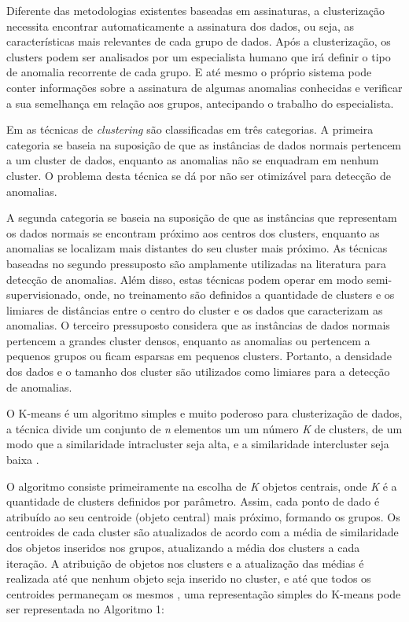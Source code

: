 \indent Diferente das metodologias existentes baseadas em assinaturas, a clusterização necessita encontrar automaticamente a assinatura dos dados, ou seja, as características mais relevantes de cada grupo de dados. Após a clusterização, os clusters podem ser analisados por um especialista humano que irá definir o tipo de anomalia recorrente de cada grupo. E até mesmo o próprio sistema pode conter informações sobre a assinatura de algumas anomalias conhecidas e verificar a sua semelhança em relação aos grupos, antecipando o trabalho do especialista.

\indent Em   as técnicas de \textit{clustering} são classificadas em três categorias. A primeira categoria se baseia na suposição de que as instâncias de dados normais pertencem a um cluster de dados, enquanto as anomalias não se enquadram em nenhum cluster. O problema desta técnica se dá por não ser otimizável para detecção de anomalias.

\indent A segunda categoria se baseia na suposição de que as instâncias que representam os dados normais se encontram próximo aos centros dos clusters, enquanto as anomalias se localizam mais distantes do seu cluster mais próximo. As técnicas baseadas no segundo pressuposto são amplamente utilizadas na literatura para detecção de anomalias. Além disso, estas técnicas podem operar em modo semi-supervisionado, onde, no treinamento são definidos a quantidade de clusters e os limiares de distâncias entre o centro do cluster e os dados que caracterizam as anomalias. O terceiro pressuposto considera que as instâncias de dados normais pertencem a grandes cluster  densos, enquanto as anomalias ou pertencem a pequenos grupos ou ficam esparsas em pequenos clusters. Portanto, a densidade dos dados e o tamanho dos cluster são utilizados como limiares para a detecção de anomalias.

\indent O K-means é um algoritmo simples e muito poderoso para clusterização de dados, a técnica divide um conjunto de \textit{n} elementos um um número \textit{K} de clusters, de um modo que a similaridade intracluster seja alta, e a similaridade intercluster seja baixa \cite{goldschmidt2005}.

\indent O algoritmo consiste primeiramente na escolha de \textit{K} objetos centrais, onde \textit{K} é a quantidade de clusters definidos por parâmetro. Assim, cada ponto de dado é atribuído ao seu centroide (objeto central) mais próximo, formando os grupos. Os centroides de cada cluster são atualizados de acordo com a média de similaridade dos objetos inseridos nos grupos, atualizando a média dos clusters a cada iteração. A atribuição de objetos nos clusters e a atualização das médias é realizada até que nenhum objeto seja inserido no cluster, e até que todos os centroides permaneçam os mesmos \cite{Tan2005}, uma representação simples do K-means pode ser representada no Algoritmo 1:

